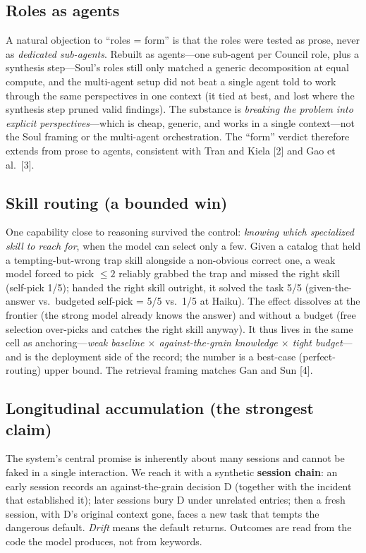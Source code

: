 \documentclass[11pt]{article}
\begin{document}
\subsection{Roles as agents}

A natural objection to ``roles = form'' is that the roles were tested as prose, never as
\emph{dedicated sub-agents}. Rebuilt as agents---one sub-agent per Council role, plus a
synthesis step---Soul's roles still only matched a generic decomposition at equal compute,
and the multi-agent setup did not beat a single agent told to work through the same
perspectives in one context (it tied at best, and lost where the synthesis step pruned
valid findings). The substance is \emph{breaking the problem into explicit perspectives}---which
is cheap, generic, and works in a single context---not the Soul framing or the multi-agent
orchestration. The ``form'' verdict therefore extends from prose to agents, consistent with
Tran and Kiela [2] and Gao et al.\ [3].

\subsection{Skill routing (a bounded win)}

One capability close to reasoning survived the control: \emph{knowing which specialized skill
to reach for}, when the model can select only a few. Given a catalog that held a
tempting-but-wrong trap skill alongside a non-obvious correct one, a weak model forced to
pick $\leq 2$ reliably grabbed the trap and missed the right skill (self-pick 1/5); handed
the right skill outright, it solved the task 5/5 (given-the-answer vs.\ budgeted self-pick
= 5/5 vs.\ 1/5 at Haiku). The effect dissolves at the frontier (the strong model already
knows the answer) and without a budget (free selection over-picks and catches the right
skill anyway). It thus lives in the same cell as anchoring---\emph{weak baseline $\times$
against-the-grain knowledge $\times$ tight budget}---and is the deployment side of the
record; the number is a best-case (perfect-routing) upper bound. The retrieval framing
matches Gan and Sun [4].

\subsection{Longitudinal accumulation (the strongest claim)}

The system's central promise is inherently about many sessions and cannot be faked in a
single interaction. We reach it with a synthetic \textbf{session chain}: an early session
records an against-the-grain decision D (together with the incident that established it);
later sessions bury D under unrelated entries; then a fresh session, with D's original
context gone, faces a new task that tempts the dangerous default. \emph{Drift} means the
default returns. Outcomes are read from the code the model produces, not from keywords.
\end{document}
